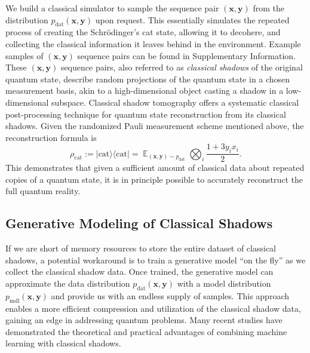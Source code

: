\documentclass[fleqn,11pt]{wlscirep}
\newcommand{\bra}[1]{\langle #1|}
\newcommand{\ket}[1]{|#1 \rangle}
\newcommand{\dsE}{\mathbb{E}}
\newcommand{\vect}[1]{{\bm{#1}}}
\newcommand{\eq}[1]{\begin{equation}#1\end{equation}}
\begin{document}
We build a classical simulator to sample the sequence pair $(\vect{x},\vect{y})$ from the distribution $p_\text{dat}(\vect{x},\vect{y})$ upon request. This essentially simulates the repeated process of creating the Schrödinger's cat state, allowing it to decohere, and collecting the classical information it leaves behind in the environment. Example samples of $(\vect{x},\vect{y})$ sequence pairs can be found in Supplementary Information. These $(\vect{x},\vect{y})$ sequence pairs, also referred to as \emph{classical shadows} of the original quantum state, describe random projections of the quantum state in a chosen measurement basis, akin to a high-dimensional object casting a shadow in a low-dimensional subspace. Classical shadow tomography offers a systematic classical post-processing technique for quantum state reconstruction from its classical shadows\cite{Ohliger2013E1204.5735, Guta2018F1809.11162, Huang2020P2002.08953}. Given the randomized Pauli measurement scheme mentioned above, the reconstruction formula is
\eq{\label{eq: rec cat}
\rho_\text{cat}:=\ket{\text{cat}}\bra{\text{cat}}=\mathop{\dsE}_{(\vect{x},\vect{y})\sim p_\text{dat}}\bigotimes_i\frac{1+3y_ix_i}{2}.}
This demonstrates that given a sufficient amount of classical data about repeated copies of a quantum state, it is in principle possible to accurately reconstruct the full quantum reality.

\subsection*{Generative Modeling of Classical Shadows}

If we are short of memory resources to store the entire dataset of classical shadows, a potential workaround is to train a generative model ``on the fly'' as we collect the classical shadow data. Once trained, the generative model can approximate the data distribution $p_\text{dat}(\vect{x},\vect{y})$ with a model distribution $p_\text{mdl}(\vect{x},\vect{y})$ and provide us with an endless supply of samples. This approach enables a more efficient compression and utilization of the classical shadow data, gaining an edge in addressing quantum problems. Many recent studies \cite{Li2020V2012.08288, Huang2021P2011.01938, Huang2021I2101.02464, Huang2021P2106.12627, Huang2022Q2112.00778, Van-Kirk2022H2212.06084, Wei2023N2305.01078, Jerbi2023S2306.00061} have demonstrated the theoretical and practical advantages of combining machine learning with classical shadows.
\end{document}
